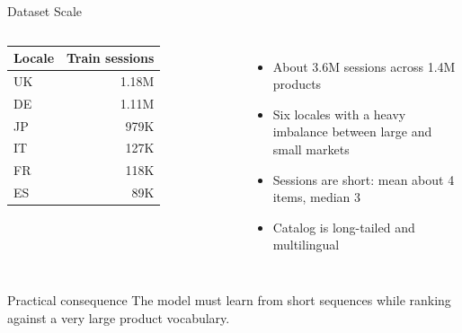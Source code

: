 \documentclass[10pt,aspectratio=169]{beamer}
\begin{document}
\begin{frame}{Dataset Scale}
  \begin{columns}[T,onlytextwidth]
      \begin{tabular}{lr}
        \toprule
        Locale & Train sessions \\
        \midrule
        UK & 1.18M \\
        DE & 1.11M \\
        JP & 979K \\
        IT & 127K \\
        FR & 118K \\
        ES & 89K \\
        \bottomrule
      \end{tabular}

      \begin{itemize}
        \item About 3.6M sessions across 1.4M products
        \item Six locales with a heavy imbalance between large and small markets
        \item Sessions are short: mean about 4 items, median 3
        \item Catalog is long-tailed and multilingual
      \end{itemize}
  \end{columns}

  \vspace{0.8em}
  \begin{alertblock}{Practical consequence}
    The model must learn from short sequences while ranking against a very large product vocabulary.
  \end{alertblock}
\end{frame}
\end{document}
